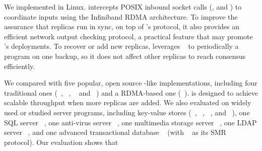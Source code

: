 


We implemented \xxx in Linux. \xxx intercepts POSIX inbound socket calls 
(\eg, \accept and \recv) to coordinate inputs using the Infiniband 
RDMA architecture. To improve the assurance that replicas run in sync, on top 
of \xxx's \paxos protocol, it also provides an efficient network output 
checking protocol, a practical feature that may promote \xxx's deployments. To 
recover or add new replicas, \xxx leverages \criu~\cite{criu} to periodically a 
program on one backup, so it does not affect other replicas to reach consensus 
efficiently.

We compared \xxx with five popular, open source \paxos-like implementations, 
including four traditional ones (\libpaxos~\cite{libpaxos}, 
\zookeeper~\cite{zookeeper}, \crane~\cite{crane:sosp15} and 
\spaxos~\cite{spaxos}) and a RDMA-based one (\dare~\cite{dare:hpdc15}). \spaxos 
is designed to achieve scalable throughput when more replicas are added. We 
also evaluated \xxx on \nprog widely used or studied server programs, including 
\nkvprog key-value stores (\redis~\cite{redis}, \memcached~\cite{memcached}, 
\ssdb~\cite{ssdb}, and \mongodb~\cite{mongodb}), one SQL server 
\mysql~\cite{mysql}, one anti-virus server \clamav~\cite{clamav}, one multimedia 
storage server \mediatomb~\cite{mediatomb}, one LDAP server 
\openldap~\cite{openldap}, and one advanced transactional database 
\calvin~\cite{calvin:sigmod12} (with \zookeeper~\cite{zookeeper} as its SMR 
protocol). Our evaluation shows that

